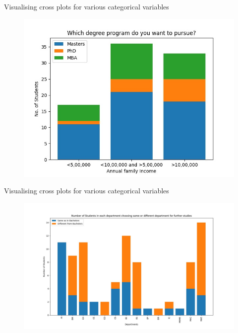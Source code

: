 \documentclass{beamer}
\begin{document}
\begin{frame}
  \begin{block}{Visualising cross plots for various categorical variables}
  \begin{figure}
  \centering
  \includegraphics[scale=0.45]{income vs degree.jpg}
  \label{fig:13}
  \end{figure}
  \end{block}
\end{frame}

\begin{frame}
  \begin{block}{Visualising cross plots for various categorical variables}
  \begin{figure}
  \centering
  \includegraphics[scale=0.2]{same or diff vs st.jpg}
  \label{fig:11}
  \end{figure}
  \end{block}
\end{frame}
\end{document}
